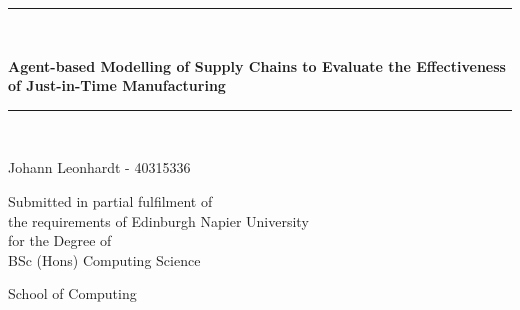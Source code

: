 \newcommand{\HRule}{\rule{\linewidth}{0.5mm}}

\begin{titlepage}
\begin{center}
\HRule \\[0.4cm]
    {\large \bfseries Agent-based Modelling of Supply Chains to Evaluate the Effectiveness of Just-in-Time Manufacturing\par}
\vspace{0.2cm}
\HRule \\[1.5cm]

\vspace{3cm}
\begin{minipage}{0.5\textwidth}
    \begin{center} \large
        Johann Leonhardt - 40315336      
    \end{center}
\end{minipage}

\vspace{2cm}
\begin{minipage}{1\textwidth}
    \begin{center} \large
    Submitted in partial fulfilment of \\
    the requirements of Edinburgh Napier University \\
    for the Degree of \\
    BSc (Hons) Computing Science
    \end{center}
\end{minipage}

\vfill

\begin{minipage}{1\textwidth}
    \begin{center} \large
    School of Computing
    \end{center}
\end{minipage}

\vspace{1cm}{\large \today}
\end{center}
\end{titlepage}
